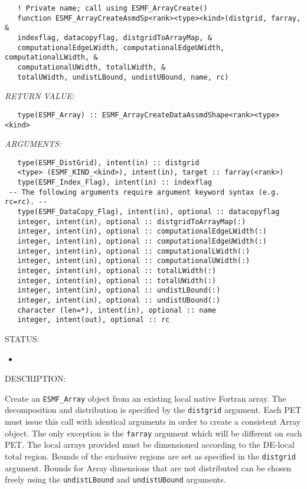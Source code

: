    
\begin{verbatim}   ! Private name; call using ESMF_ArrayCreate() 
   function ESMF_ArrayCreateAsmdSp<rank><type><kind>(distgrid, farray, & 
   indexflag, datacopyflag, distgridToArrayMap, & 
   computationalEdgeLWidth, computationalEdgeUWidth, computationalLWidth, & 
   computationalUWidth, totalLWidth, & 
   totalUWidth, undistLBound, undistUBound, name, rc) 
   \end{verbatim}{\em RETURN VALUE:}
\begin{verbatim}   type(ESMF_Array) :: ESMF_ArrayCreateDataAssmdShape<rank><type><kind> 
   \end{verbatim}{\em ARGUMENTS:}
\begin{verbatim}   type(ESMF_DistGrid), intent(in) :: distgrid 
   <type> (ESMF_KIND_<kind>), intent(in), target :: farray(<rank>) 
   type(ESMF_Index_Flag), intent(in) :: indexflag 
 -- The following arguments require argument keyword syntax (e.g. rc=rc). --
   type(ESMF_DataCopy_Flag), intent(in), optional :: datacopyflag 
   integer, intent(in), optional :: distgridToArrayMap(:) 
   integer, intent(in), optional :: computationalEdgeLWidth(:) 
   integer, intent(in), optional :: computationalEdgeUWidth(:) 
   integer, intent(in), optional :: computationalLWidth(:) 
   integer, intent(in), optional :: computationalUWidth(:) 
   integer, intent(in), optional :: totalLWidth(:) 
   integer, intent(in), optional :: totalUWidth(:) 
   integer, intent(in), optional :: undistLBound(:) 
   integer, intent(in), optional :: undistUBound(:) 
   character (len=*), intent(in), optional :: name 
   integer, intent(out), optional :: rc 
   \end{verbatim}
{\sf STATUS:}
   \begin{itemize} 
   \item{} 
   \end{itemize} 
   
{\sf DESCRIPTION:\\ }

 
   Create an {\tt ESMF\_Array} object from an existing local native Fortran 
   array. The decomposition and distribution is 
   specified by the {\tt distgrid} argument. Each PET must issue this call 
   with identical arguments in order to create a consistent Array object. 
   The only exception is the {\tt farray} argument which will be different 
   on each PET. The local arrays provided must be dimensioned according to 
   the DE-local total region. Bounds of the exclusive regions are set as 
   specified in the {\tt distgrid} argument. Bounds for Array dimensions 
   that are not distributed can be chosen freely using the 
   {\tt undistLBound} and {\tt undistUBound} arguments. 
   
